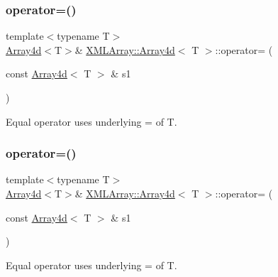 \subsubsection{\texorpdfstring{operator=()}{operator=()}\hspace{0.1cm}{\footnotesize\ttfamily [2/6]}}
{\footnotesize\ttfamily template$<$typename T$>$ \\
\mbox{\hyperlink{classXMLArray_1_1Array4d}{Array4d}}$<$T$>$\& \mbox{\hyperlink{classXMLArray_1_1Array4d}{X\+M\+L\+Array\+::\+Array4d}}$<$ T $>$\+::operator= (\begin{DoxyParamCaption}\item[{const \mbox{\hyperlink{classXMLArray_1_1Array4d}{Array4d}}$<$ T $>$ \&}]{s1 }\end{DoxyParamCaption})\hspace{0.3cm}{\ttfamily [inline]}}



Equal operator uses underlying = of T. 

\mbox{\label{classXMLArray_1_1Array4d_a3231647c370f838502526de102af1b23}} 
\subsubsection{\texorpdfstring{operator=()}{operator=()}\hspace{0.1cm}{\footnotesize\ttfamily [3/6]}}
{\footnotesize\ttfamily template$<$typename T$>$ \\
\mbox{\hyperlink{classXMLArray_1_1Array4d}{Array4d}}$<$T$>$\& \mbox{\hyperlink{classXMLArray_1_1Array4d}{X\+M\+L\+Array\+::\+Array4d}}$<$ T $>$\+::operator= (\begin{DoxyParamCaption}\item[{const \mbox{\hyperlink{classXMLArray_1_1Array4d}{Array4d}}$<$ T $>$ \&}]{s1 }\end{DoxyParamCaption})\hspace{0.3cm}{\ttfamily [inline]}}



Equal operator uses underlying = of T. 

\mbox{\label{classXMLArray_1_1Array4d_a15b8c36a1edd1f72a12301798e0810b5}} 
